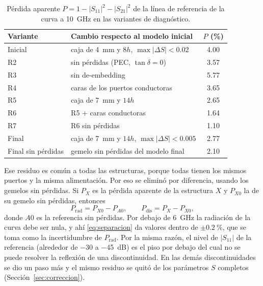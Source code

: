 \documentclass[11pt,letterpaper]{article}
\begin{document}
\begin{table}[htbp]
\centering
\caption{Pérdida aparente $P=1-|S_{11}|^2-|S_{21}|^2$ de la línea de referencia de la curva a \SI{10}{GHz} en las variantes de diagnóstico.}
\label{tab:diag}
\small
\begin{tabular}{llc}
\toprule
Variante & Cambio respecto al modelo inicial & $P$ (\%) \\
\midrule
Inicial & caja de \SI{4}{mm} y $8h$, $\max|\Delta S|<0.02$ & 4.00 \\
R2 & sin pérdidas (PEC, $\tan\delta=0$) & 3.57 \\
R3 & sin de-embedding & 5.77 \\
R4 & caras de los puertos conductoras & 3.65 \\
R5 & caja de \SI{7}{mm} y $14h$ & 2.65 \\
R6 & R5 + caras conductoras & 1.64 \\
R7 & R6 sin pérdidas & 1.10 \\
Final & caja de \SI{7}{mm} y $14h$, $\max|\Delta S|<0.005$ & 2.77 \\
Final sin pérdidas & gemelo sin pérdidas del modelo final & 2.10 \\
\bottomrule
\end{tabular}
\end{table}

Ese residuo es común a todas las estructuras, porque todas tienen los mismos puertos y la misma alimentación. Por eso se eliminó por diferencia, usando los gemelos sin pérdidas. Si $P_X$ es la pérdida aparente de la estructura $X$ y $P_{X0}$ la de su gemelo sin pérdidas, entonces
\begin{equation}
P_{\mathrm{rad}} = P_{X0} - P_{A0}, \qquad P_{\mathrm{dis}} = P_X - P_{X0},
\label{eq:separacion}
\end{equation}
donde $A0$ es la referencia sin pérdidas. Por debajo de \SI{6}{GHz} la radiación de la curva debe ser nula, y ahí \eqref{eq:separacion} da valores dentro de $\pm\SI{0.2}{\percent}$, que se toma como la incertidumbre de $P_{\mathrm{rad}}$. Por la misma razón, el nivel de $|S_{11}|$ de la referencia (alrededor de $-30$ a \SI{-45}{dB}) es el piso por debajo del cual no se puede resolver la reflexión de una discontinuidad. En las demás discontinuidades se dio un paso más y el mismo residuo se quitó de los parámetros $S$ completos (Sección~\ref{sec:correccion}).
\end{document}
